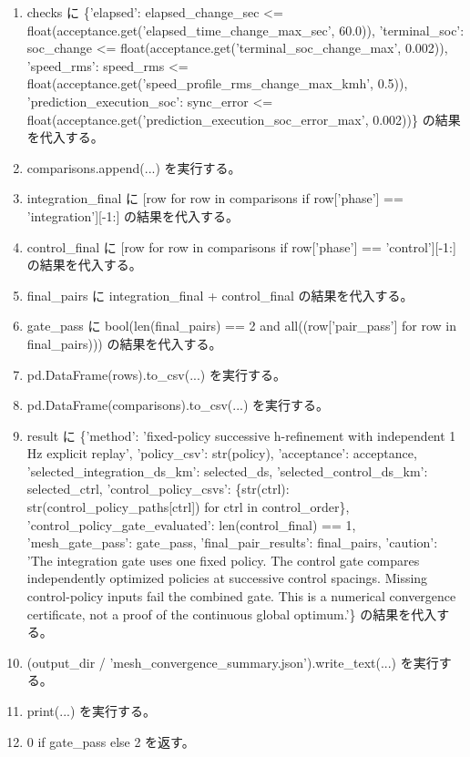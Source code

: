 \documentclass[a4paper,11pt]{article}
\begin{document}
\begin{enumerate}[leftmargin=1.8em]
\item     checks に \{'elapsed': elapsed\_change\_sec <= float(acceptance.get('elapsed\_time\_change\_max\_sec', 60.0)), 'terminal\_soc': soc\_change <= float(acceptance.get('terminal\_soc\_change\_max', 0.002)), 'speed\_rms': speed\_rms <= float(acceptance.get('speed\_profile\_rms\_change\_max\_kmh', 0.5)), 'prediction\_execution\_soc': sync\_error <= float(acceptance.get('prediction\_execution\_soc\_error\_max', 0.002))\} の結果を代入する。
\item     comparisons.append(...) を実行する。
\item integration\_final に [row for row in comparisons if row['phase'] == 'integration'][-1:] の結果を代入する。
\item control\_final に [row for row in comparisons if row['phase'] == 'control'][-1:] の結果を代入する。
\item final\_pairs に integration\_final + control\_final の結果を代入する。
\item gate\_pass に bool(len(final\_pairs) == 2 and all((row['pair\_pass'] for row in final\_pairs))) の結果を代入する。
\item pd.DataFrame(rows).to\_csv(...) を実行する。
\item pd.DataFrame(comparisons).to\_csv(...) を実行する。
\item result に \{'method': 'fixed-policy successive h-refinement with independent 1 Hz explicit replay', 'policy\_csv': str(policy), 'acceptance': acceptance, 'selected\_integration\_ds\_km': selected\_ds, 'selected\_control\_ds\_km': selected\_ctrl, 'control\_policy\_csvs': \{str(ctrl): str(control\_policy\_paths[ctrl]) for ctrl in control\_order\}, 'control\_policy\_gate\_evaluated': len(control\_final) == 1, 'mesh\_gate\_pass': gate\_pass, 'final\_pair\_results': final\_pairs, 'caution': 'The integration gate uses one fixed policy. The control gate compares independently optimized policies at successive control spacings. Missing control-policy inputs fail the combined gate. This is a numerical convergence certificate, not a proof of the continuous global optimum.'\} の結果を代入する。
\item (output\_dir / 'mesh\_convergence\_summary.json').write\_text(...) を実行する。
\item print(...) を実行する。
\item 0 if gate\_pass else 2 を返す。
            \end{enumerate}
\end{document}
